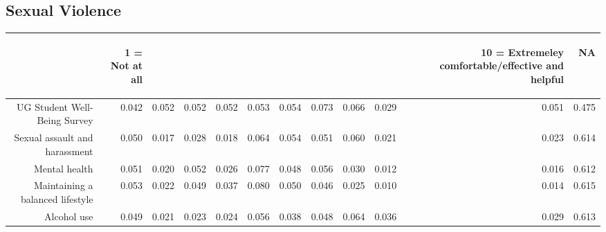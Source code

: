 \documentclass{article}\usepackage[]{graphicx}\usepackage[]{color}
\makeatletter
\newenvironment{kframe}{%
 \def\at@end@of@kframe{}%
 \ifinner\ifhmode%
  \def\at@end@of@kframe{\end{minipage}}%
  \begin{minipage}{\columnwidth}%
 \fi\fi%
 \def\FrameCommand##1{\hskip\@totalleftmargin \hskip-\fboxsep
 \colorbox{shadecolor}{##1}\hskip-\fboxsep
     \hskip-\linewidth \hskip-\@totalleftmargin \hskip\columnwidth}%
 \MakeFramed {\advance\hsize-\width
   \@totalleftmargin\z@ \linewidth\hsize
   \@setminipage}}%
 {\par\unskip\endMakeFramed%
 \at@end@of@kframe}
\makeatother
\begin{document}
\subsection{Sexual Violence}
\begin{kframe}


{\ttfamily\noindent\bfseries{}}\end{kframe}%
\begin{table}[ht]
\centering
\begin{tabular}{rrrrrrrrrrrr}
  \hline
 & \begin{sideways} 1 = Not at all \end{sideways} & \begin{sideways}   \end{sideways} & \begin{sideways}   \end{sideways} & \begin{sideways}   \end{sideways} & \begin{sideways}   \end{sideways} & \begin{sideways}   \end{sideways} & \begin{sideways}   \end{sideways} & \begin{sideways}   \end{sideways} & \begin{sideways}   \end{sideways} & \begin{sideways} 10 = Extremeley comfortable/effective and helpful \end{sideways} & \begin{sideways} NA \end{sideways} \\ 
  \hline
UG Student Well-Being Survey & 0.042 & 0.052 & 0.052 & 0.052 & 0.053 & 0.054 & 0.073 & 0.066 & 0.029 & 0.051 & 0.475 \\ 
  Sexual assault and harassment & 0.050 & 0.017 & 0.028 & 0.018 & 0.064 & 0.054 & 0.051 & 0.060 & 0.021 & 0.023 & 0.614 \\ 
  Mental health & 0.051 & 0.020 & 0.052 & 0.026 & 0.077 & 0.048 & 0.056 & 0.030 & 0.012 & 0.016 & 0.612 \\ 
  Maintaining a balanced lifestyle & 0.053 & 0.022 & 0.049 & 0.037 & 0.080 & 0.050 & 0.046 & 0.025 & 0.010 & 0.014 & 0.615 \\ 
  Alcohol use & 0.049 & 0.021 & 0.023 & 0.024 & 0.056 & 0.038 & 0.048 & 0.064 & 0.036 & 0.029 & 0.613 \\ 
   \hline
\end{tabular}
\end{table}
\end{document}
